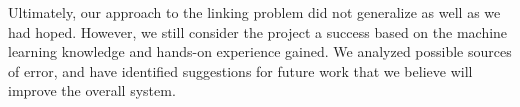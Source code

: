 Ultimately, our approach to the linking problem did not generalize as well as we had hoped. However, we still consider the project a success based on the machine learning knowledge and hands-on experience gained. We analyzed possible sources of error, and have identified suggestions for future work that we believe will improve the overall system. 


